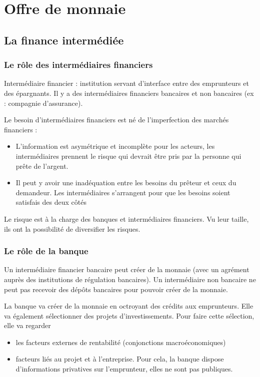 \chapter{Offre de monnaie}

\section{La finance intermédiée}

	\subsection{Le rôle des intermédiaires financiers}
	
	Intermédiaire financier : institution servant d'interface entre des emprunteurs et des épargnants. Il y a des intermédiaires financiers bancaires et non bancaires (ex : compagnie d'assurance).
	
	Le besoin d'intermédiaires financiers est né de l'imperfection des marchés financiers :
	
	\begin{itemize}
		\item L'information est asymétrique et incomplète pour les acteurs, les intermédiaires prennent le risque qui devrait être pris par la personne qui prête de l'argent.
	
		\item Il peut y avoir une inadéquation entre les besoins du prêteur et ceux du demandeur. Les intermédiaires s'arrangent pour que les besoins soient satisfais des deux côtés
\end{itemize}
	Le risque est à la charge des banques et intermédiaires financiers. Vu leur taille, ils ont la possibilité de diversifier les risques.
	
	
	\subsection{Le rôle de la banque}
	
	Un intermédiaire financier bancaire peut créer de la monnaie (avec un agrément auprès des institutions de régulation bancaires). Un intermédiaire non bancaire ne peut pas recevoir des dépôts bancaires pour pouvoir créer de la monnaie.
	
	La banque va créer de la monnaie en octroyant des crédits aux emprunteurs. Elle va également sélectionner des projets d'investissements. Pour faire cette sélection, elle va regarder
	
	\begin{itemize}
		\item les facteurs externes de rentabilité (conjonctions macroéconomiques)
		\item facteurs liés  au projet et à l'entreprise. Pour cela, la banque dispose d'informations privatives sur l'emprunteur, elles ne sont pas publiques.
	\end{itemize}
	
